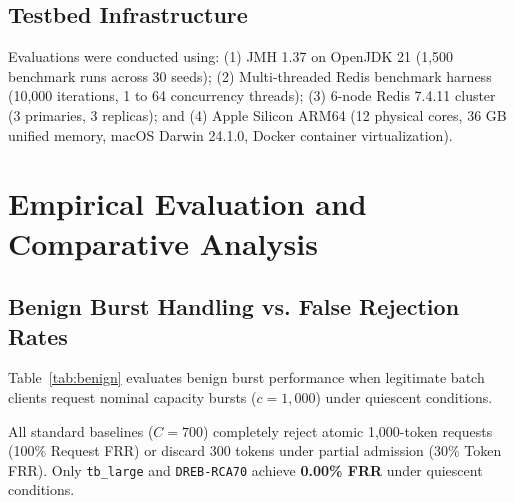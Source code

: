 \documentclass[conference]{IEEEtran}
\begin{document}
\subsection{Testbed Infrastructure}
Evaluations were conducted using: (1) JMH 1.37 on OpenJDK 21 (1,500 benchmark runs across 30 seeds); (2) Multi-threaded Redis benchmark harness (10,000 iterations, 1 to 64 concurrency threads); (3) 6-node Redis 7.4.11 cluster (3 primaries, 3 replicas); and (4) Apple Silicon ARM64 (12 physical cores, 36 GB unified memory, macOS Darwin 24.1.0, Docker container virtualization).

\section{Empirical Evaluation and Comparative Analysis}

\subsection{Benign Burst Handling vs. False Rejection Rates}
Table~\ref{tab:benign} evaluates benign burst performance when legitimate batch clients request nominal capacity bursts ($c = 1,000$) under quiescent conditions.

\begin{table}[t]
\centering
\caption{Benign burst tolerance and False Rejection Rates (FRR) under 1,000-token batch bursts.}
\label{tab:benign}
\end{table}

All standard baselines ($C = 700$) completely reject atomic 1,000-token requests (100\% Request FRR) or discard 300 tokens under partial admission (30\% Token FRR). Only \texttt{tb\_large} and \texttt{DREB-RCA70} achieve \textbf{0.00\% FRR} under quiescent conditions.
\end{document}
